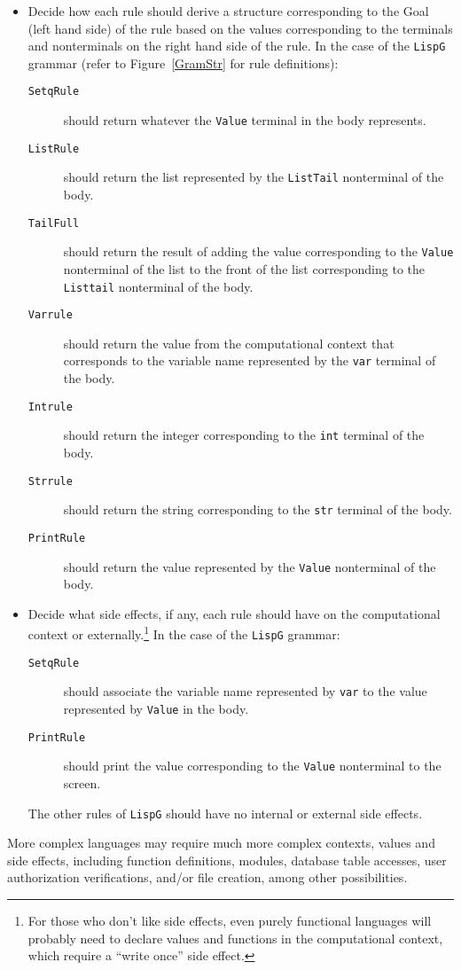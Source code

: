 \begin{itemize}
\item
Decide how each rule should derive a structure corresponding
to the Goal (left hand side) of the rule based on the
values corresponding to the terminals and nonterminals
on the right hand side of the rule.
In the case of the {\tt LispG} grammar
(refer to Figure~\ref{GramStr} for rule definitions):
\begin{description}
\item[\tt SetqRule]
  should return whatever the {\tt Value} terminal in the body
  represents.
\item[\tt ListRule]
  should return the list represented by the 
  {\tt ListTail} nonterminal of the body.
\item[\tt TailFull]
  should return the result of adding the value corresponding
  to the {\tt Value} nonterminal of the list to the front
  of the list corresponding to the {\tt Listtail} nonterminal
  of the body.
\item[\tt Varrule]
  should return the value from the computational
  context that corresponds to the variable
  name represented by the {\tt var} terminal of the body.
\item[\tt Intrule]
  should return the integer corresponding to the {\tt int}
  terminal of the body.
\item[\tt Strrule]
  should return the string corresponding to the {\tt str}
  terminal of the body.
\item[\tt PrintRule]
  should return the value represented by the {\tt Value}
  nonterminal of the body.
\end{description}
\item
Decide what side effects, if any, each rule should have on
the computational context or 
externally.\footnote{For those who don't like side effects,
even purely functional languages will probably need to declare
values and functions in the computational context, which
require a ``write once'' side effect.}
In the case of the {\tt LispG} grammar:
\begin{description}
\item[\tt SetqRule]
  should associate the variable name represented by {\tt var}
  to the value represented by {\tt Value} in the body.
\item[\tt PrintRule]
  should print the value corresponding to the {\tt Value}
  nonterminal to the screen.
\end{description}
The other rules of {\tt LispG}
should have no internal or external side effects.
\end{itemize}
More complex languages may require much more complex contexts,
values and side effects, including
function definitions, modules, database
table accesses, user authorization
verifications, and/or file creation, among other possibilities.


